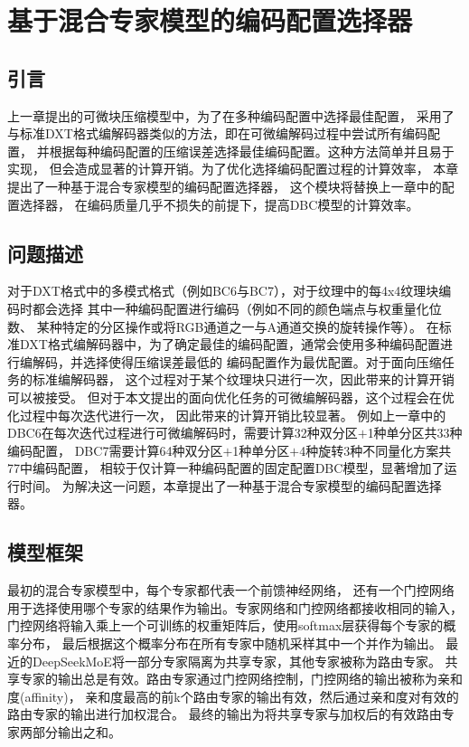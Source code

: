 
\chapter{基于混合专家模型的编码配置选择器}

\section{引言}

上一章提出的可微块压缩模型中，为了在多种编码配置中选择最佳配置，
采用了与标准DXT格式编解码器类似的方法，即在可微编解码过程中尝试所有编码配置，
并根据每种编码配置的压缩误差选择最佳编码配置。这种方法简单并且易于实现，
但会造成显著的计算开销。为了优化选择编码配置过程的计算效率，
本章提出了一种基于混合专家模型的编码配置选择器，
这个模块将替换上一章中的配置选择器，
在编码质量几乎不损失的前提下，提高DBC模型的计算效率。

\section{问题描述}

对于DXT格式中的多模式格式（例如BC6与BC7），对于纹理中的每4x4纹理块编码时都会选择
其中一种编码配置进行编码（例如不同的颜色端点与权重量化位数、
某种特定的分区操作或将RGB通道之一与A通道交换的旋转操作等）。
在标准DXT格式编解码器中，为了确定最佳的编码配置，通常会使用多种编码配置进行编解码，并选择使得压缩误差最低的
编码配置作为最优配置。对于面向压缩任务的标准编解码器，
这个过程对于某个纹理块只进行一次，因此带来的计算开销可以被接受。
但对于本文提出的面向优化任务的可微编解码器，这个过程会在优化过程中每次迭代进行一次，
因此带来的计算开销比较显著。
例如上一章中的DBC6在每次迭代过程进行可微编解码时，需要计算32种双分区$+$1种单分区共33种编码配置，
DBC7需要计算64种双分区$+$1种单分区$+$4种旋转\times3种不同量化方案共77中编码配置，
相较于仅计算一种编码配置的固定配置DBC模型，显著增加了运行时间。
为解决这一问题，本章提出了一种基于混合专家模型的编码配置选择器。

\section{模型框架}

最初的混合专家模型中，每个专家都代表一个前馈神经网络，
还有一个门控网络用于选择使用哪个专家的结果作为输出。专家网络和门控网络都接收相同的输入，
门控网络将输入乘上一个可训练的权重矩阵后，使用softmax层获得每个专家的概率分布，
最后根据这个概率分布在所有专家中随机采样其中一个并作为输出。
最近的DeepSeekMoE\cite{dai2024deepseekmoe}将一部分专家隔离为共享专家，其他专家被称为路由专家。
共享专家的输出总是有效。路由专家通过门控网络控制，门控网络的输出被称为亲和度(affinity)，
亲和度最高的前k个路由专家的输出有效，然后通过亲和度对有效的路由专家的输出进行加权混合。
最终的输出为将共享专家与加权后的有效路由专家两部分输出之和。

